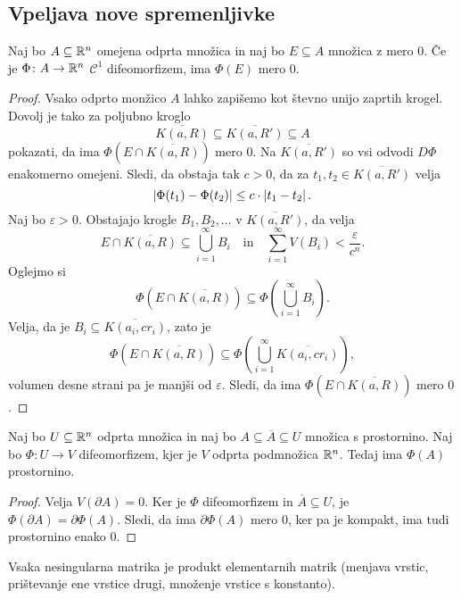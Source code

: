 \subsection{Vpeljava nove spremenljivke}

\begin{lema}
Naj bo $A \subseteq \mathbb{R}^n$ omejena odprta množica in naj bo
$E \subseteq A$ množica z mero $0$. Če je $\Phi \colon A \to \mathbb{R}^n$
$\mathcal{C}^1$ difeomorfizem, ima $\Phi(E)$ mero $0$.
\end{lema}

\begin{proof}
Vsako odprto monžico $A$ lahko zapišemo kot števno unijo zaprtih
krogel. Dovolj je tako za poljubno kroglo
\[
\overline{K(a,R)} \subseteq \overline{K(a,R')} \subseteq A
\]
pokazati, da ima $\Phi(E \cap \overline{K(a,R)})$ mero $0$. Na
$\overline{K(a,R')}$ so vsi odvodi $D\Phi$ enakomerno omejeni.
Sledi, da obstaja tak $c > 0$, da za
$t_1,t_2 \in \overline{K(a,R')}$ velja
\[
\left\lvert \Phi(t_1) - \Phi(t_2)\right\rvert \leq c \cdot \left\lvert t_1 - t_2\right\rvert.
\]
Naj bo $\varepsilon > 0$. Obstajajo krogle $B_1,B_2,\dots$ v
$\overline{K(a,R')}$, da velja
\[
E \cap \overline{K(a,R)} \subseteq \bigcup_{i=1}^\infty B_i
\quad \text{in} \quad
\sum_{i=1}^\infty V(B_i) < \frac{\varepsilon}{c^n}.
\]
Oglejmo si
\[
\Phi(E \cap \overline{K(a,R)}) \subseteq
\Phi(\bigcup_{i=1}^\infty B_i).
\]
Velja, da je $B_i \subseteq \overline{K(a_i, cr_i)}$, zato je
\[
\Phi(E \cap \overline{K(a,R)}) \subseteq
\Phi(\bigcup_{i=1}^\infty \overline{K(a_i, cr_i)}),
\]
volumen desne strani pa je manjši od $\varepsilon$. Sledi, da ima
$\Phi(E \cap \overline{K(a,R)})$ mero $0$.
\end{proof}

\begin{posledica}
Naj bo $U \subseteq \mathbb{R}^n$ odprta množica in naj bo
$A \subseteq \overline{A} \subseteq U$ množica s prostornino. Naj
bo $\Phi \colon U \to V$ difeomorfizem, kjer je $V$ odprta
podmnožica $\mathbb{R}^n$. Tedaj ima $\Phi(A)$ prostornino.
\end{posledica}

\begin{proof}
Velja $V(\partial A) = 0$. Ker je $\Phi$ difeomorfizem in
$\overline{A} \subseteq U$, je
$\Phi(\partial A) = \partial \Phi(A)$. Sledi, da ima
$\partial \Phi(A)$ mero $0$, ker pa je kompakt, ima tudi
prostornino enako $0$.
\end{proof}


\begin{lema}
Vsaka nesingularna matrika je produkt elementarnih matrik (menjava
vrstic, prištevanje ene vrstice drugi, množenje vrstice s
konstanto).
\end{lema}

